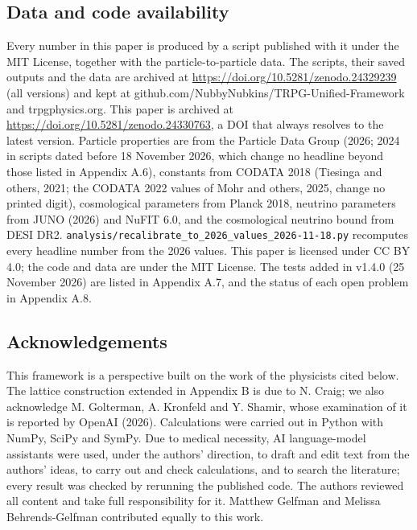 \documentclass[
  11pt,
]{article}
\begin{document}
\hypertarget{data-and-code-availability}{%
\subsection{Data and code availability}\label{data-and-code-availability}}

Every number in this paper is produced by a script published with it under the MIT License, together with the particle-to-particle data. The scripts, their saved outputs and the data are archived at \url{https://doi.org/10.5281/zenodo.24329239} (all versions) and kept at github.com/NubbyNubkins/TRPG-Unified-Framework and trpgphysics.org. This paper is archived at \url{https://doi.org/10.5281/zenodo.24330763}, a DOI that always resolves to the latest version. Particle properties are from the Particle Data Group (2026; 2024 in scripts dated before 18 November 2026, which change no headline beyond those listed in Appendix A.6), constants from CODATA 2018 (Tiesinga and others, 2021; the CODATA 2022 values of Mohr and others, 2025, change no printed digit), cosmological parameters from Planck 2018, neutrino parameters from JUNO (2026) and NuFIT 6.0, and the cosmological neutrino bound from DESI DR2. \texttt{analysis/recalibrate\_to\_2026\_values\_2026-11-18.py} recomputes every headline number from the 2026 values. This paper is licensed under CC BY 4.0; the code and data are under the MIT License. The tests added in v1.4.0 (25 November 2026) are listed in Appendix A.7, and the status of each open problem in Appendix A.8.

\hypertarget{acknowledgements}{%
\subsection{Acknowledgements}\label{acknowledgements}}

This framework is a perspective built on the work of the physicists cited below. The lattice construction extended in Appendix B is due to N. Craig; we also acknowledge M. Golterman, A. Kronfeld and Y. Shamir, whose examination of it is reported by OpenAI (2026). Calculations were carried out in Python with NumPy, SciPy and SymPy. Due to medical necessity, AI language-model assistants were used, under the authors' direction, to draft and edit text from the authors' ideas, to carry out and check calculations, and to search the literature; every result was checked by rerunning the published code. The authors reviewed all content and take full responsibility for it. Matthew Gelfman and Melissa Behrends-Gelfman contributed equally to this work.
\end{document}
